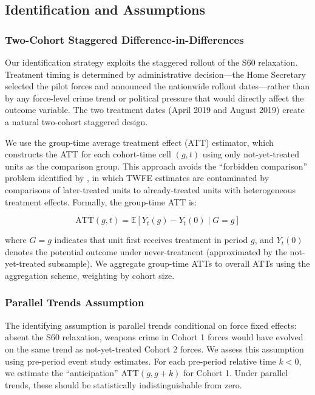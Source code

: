 \documentclass[12pt]{article}
\newcommand{\E}{\mathbb{E}}
\begin{document}
\subsection{Identification and Assumptions}

\subsubsection*{Two-Cohort Staggered Difference-in-Differences}

Our identification strategy exploits the staggered rollout of the S60 relaxation. Treatment timing is determined by administrative decision---the Home Secretary selected the pilot forces and announced the nationwide rollout dates---rather than by any force-level crime trend or political pressure that would directly affect the outcome variable. The two treatment dates (April 2019 and August 2019) create a natural two-cohort staggered design.

We use the \citet{callaway2021} group-time average treatment effect (ATT) estimator, which constructs the ATT for each cohort-time cell $(g,t)$ using only not-yet-treated units as the comparison group. This approach avoids the ``forbidden comparison'' problem identified by \citet{goodman2021}, in which TWFE estimates are contaminated by comparisons of later-treated units to already-treated units with heterogeneous treatment effects. Formally, the group-time ATT is:

\begin{equation}
\text{ATT}(g, t) = \E[Y_t(g) - Y_t(0) \mid G = g]
\end{equation}

where $G = g$ indicates that unit first receives treatment in period $g$, and $Y_t(0)$ denotes the potential outcome under never-treatment (approximated by the not-yet-treated subsample). We aggregate group-time ATTs to overall ATTs using the \citet{callaway2021} aggregation scheme, weighting by cohort size.

\subsubsection*{Parallel Trends Assumption}

The identifying assumption is parallel trends conditional on force fixed effects: absent the S60 relaxation, weapons crime in Cohort 1 forces would have evolved on the same trend as not-yet-treated Cohort 2 forces. We assess this assumption using pre-period event study estimates. For each pre-period relative time $k < 0$, we estimate the ``anticipation'' ATT$(g, g+k)$ for Cohort 1. Under parallel trends, these should be statistically indistinguishable from zero.
\end{document}
